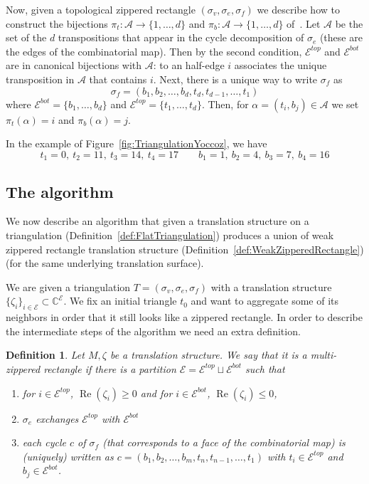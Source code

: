 \documentclass{article}
\def\CC{\mathbb{C}}
\def\cA{\mathcal{A}}
\def\cE{\mathcal{E}}
\def\Re{\operatorname{Re}}
\newtheorem{definition}{Definition}
\begin{document}
Now, given a topological zippered rectangle $(\sigma_v, \sigma_e, \sigma_f)$ we describe
how to construct the bijections $\pi_t:\cA \to \{1,\ldots,d\}$ and $\pi_b: \cA \to \{1,\ldots,d\}$ of~\cite{Yoccoz}.
Let $\cA$ be the set of the $d$ transpositions that appear in the cycle decomposition
of $\sigma_e$ (these are the edges of the combinatorial map). Then by the second
condition, $\cE^{top}$ and $\cE^{bot}$ are in canonical bijections with $\cA$: to an
half-edge $i$ associates the unique transposition in $\cA$ that contains $i$.
Next, there is a unique way to write $\sigma_f$ as
\[
\sigma_f = (b_1, b_2, \ldots, b_d, t_d, t_{d-1}, \ldots, t_1)
\]
where $\cE^{bot} = \{b_1, \ldots, b_d\}$ and $\cE^{top} = \{t_1, \ldots, t_d\}$.
Then, for $\alpha = (t_i, b_j) \in \cA$ we set $\pi_t(\alpha) = i$ and $\pi_b(\alpha) = j$.

In the example of Figure~\ref{fig:TriangulationYoccoz}, we have
\[
t_1 = 0,\ t_2 = 11,\ t_3 = 14,\ t_4 = 17
\qquad
b_1 = 1,\ b_2 = 4,\ b_3 = 7,\ b_4 = 16
\]

\subsection{The algorithm}
We now describe an algorithm that given a translation structure on
a triangulation (Definition~\ref{def:FlatTriangulation}) produces a union
of weak zippered rectangle translation structure (Definition~\ref{def:WeakZipperedRectangle})
(for the same underlying translation surface).

We are given a triangulation $T = (\sigma_v, \sigma_e, \sigma_f)$ with a
translation structure $\{\zeta_i\}_{i \in \cE} \subset \CC^\cE$.
We fix an initial triangle $t_0$ and want to aggregate some of its neighbors
in order that it still looks like a zippered rectangle. In order to describe
the intermediate steps of the algorithm we need an extra definition.
\begin{definition}
Let $M,\zeta$ be a translation structure. We say that it is a
\emph{multi-zippered rectangle} if there is a partition $\cE = \cE^{top} \sqcup \cE^{bot}$
such that
\begin{enumerate}
\item for $i \in \cE^{top}$, $\Re(\zeta_i) \geq 0$ and for $i \in \cE^{bot}$, $\Re(\zeta_i) \leq 0$,
\item $\sigma_e$ exchanges $\cE^{top}$ with $\cE^{bot}$
\item each cycle $c$ of $\sigma_f$ (that corresponds to a face of the combinatorial map)
is (uniquely) written as $c = (b_1, b_2, \ldots, b_m, t_n, t_{n-1}, \ldots, t_1)$ with
$t_i \in \cE^{top}$ and $b_j \in \cE^{bot}$.
\end{enumerate}
\end{definition}
\end{document}
